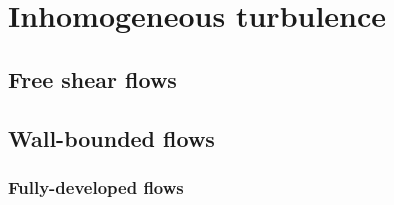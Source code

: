 \documentclass[oneside,a4paper,11pt]{report}
\newcommand{\uiavg}{\langle U_i \rangle}
\newcommand{\ujavg}{\langle U_j \rangle}
\newcommand{\ulavg}{\langle U_l \rangle}
\begin{document}

\part{Inhomogeneous turbulence}

%
\chapter{Free shear flows}
%

%
\chapter{Wall-bounded flows}
%

\section{Fully-developed flows}
\end{document}
